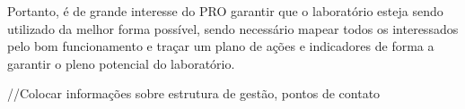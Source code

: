 Portanto, é de grande interesse do PRO garantir que o laboratório esteja sendo utilizado da melhor forma possível, sendo necessário mapear todos os interessados pelo bom funcionamento e traçar um plano de ações e indicadores de forma a garantir o pleno potencial do laboratório.

//Colocar informações sobre estrutura de gestão, pontos de contato
